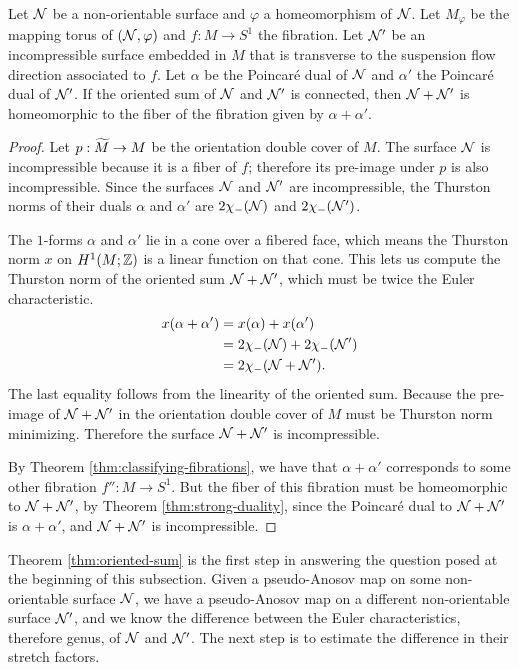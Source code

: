\begin{thm}
  \label{thm:oriented-sum}
  Let $\mathcal{N}$ be a non-orientable surface and $\varphi$ a homeomorphism of $\mathcal{N}$.
  Let $M_\varphi$ be the mapping torus of $(\mathcal{N},\varphi)$ and $f:M\rightarrow S^1$ the fibration.
  Let $\mathcal{N}'$ be an incompressible surface embedded in $M$ that is transverse to the suspension flow direction associated to $f$.
  Let $\alpha$ be the Poincar\'e dual of $\mathcal{N}$ and $\alpha'$ the Poincar\'e dual of $\mathcal{N}'$.
  If the oriented sum of $\mathcal{N}$ and $\mathcal{N}'$ is connected, then $\mathcal{N} + \mathcal{N}'$ is homeomorphic to the fiber of the fibration given by $\alpha + \alpha'$.
\end{thm}
\begin{proof}
  Let $p:\widetilde{M}\rightarrow M$ be the orientation double cover of $M$.
  The surface $\mathcal{N}$ is incompressible because it is a fiber of $f$; therefore its pre-image under $p$ is also incompressible.
  Since the surfaces $\mathcal{N}$ and $\mathcal{N}'$ are incompressible, the Thurston norms of  their duals $\alpha$ and $\alpha'$ are $2\chi_-(\mathcal{N})$ and $2\chi_{-}(\mathcal{N}')$.

  The $1$-forms $\alpha$ and $\alpha'$ lie in a cone over a fibered face, which means the Thurston norm $x$ on $H^1(M;\mathbb{Z})$ is a linear function on that cone.
  This lets us compute the Thurston norm of the oriented sum $\mathcal{N} + \mathcal{N}'$, which must be twice the Euler characteristic.
  \begin{align*}
    x(\alpha + \alpha') &= x(\alpha) + x(\alpha') \\
                        &= 2\chi_-(\mathcal{N}) + 2\chi_-(\mathcal{N}') \\
                        &= 2\chi_-(\mathcal{N} + \mathcal{N}').
  \end{align*}
  The last equality follows from the linearity of the oriented sum.
  Because the pre-image of $\mathcal{N} + \mathcal{N}'$ in the orientation double cover of $M$ must be Thurston norm minimizing.
  Therefore the surface $\mathcal{N}+\mathcal{N}'$ is incompressible.

  By Theorem \ref{thm:classifying-fibrations}, we have that $\alpha + \alpha'$ corresponds to some other fibration $f'':M\rightarrow S^1$.
  But the fiber of this fibration must be homeomorphic to $\mathcal{N} + \mathcal{N}'$, by Theorem \ref{thm:strong-duality}, since the Poincar\'e dual to $\mathcal{N} + \mathcal{N}'$ is $\alpha + \alpha'$, and $\mathcal{N} + \mathcal{N}'$ is incompressible.
\end{proof}

Theorem \ref{thm:oriented-sum} is the first step in answering the question posed at the beginning of this subsection.
Given a pseudo-Anosov map on some non-orientable surface $\mathcal{N}$, we have a pseudo-Anosov map on a different non-orientable surface $\mathcal{N}'$, and we know the difference between the Euler characteristics, therefore genus, of $\mathcal{N}$ and $\mathcal{N}'$.
The next step is to estimate the difference in their stretch factors.

